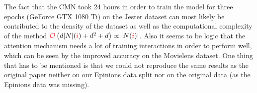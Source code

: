The fact that the CMN took 24 hours in order to train the model for three epochs (GeForce GTX 1080 Ti) on the Jester dataset can most likely be contributed
to the density of the dataset as well as the computational complexity of the method
$\bigO\left(d\abs{N}(\idxi)+d^2+d\right)\propto\abs{N(\idxi)}$.
Also it seems to be logic that the attention mechanism needs a lot of training interactions in order to perform well, which can be seen by the improved accuracy on the Movielens dataset.
One thing that has to be mentioned is that we could not reproduce the same results as the original paper neither on our Epinions data split nor on the original data (as the Epinions data was missing).
